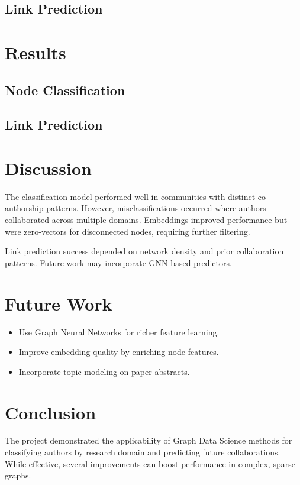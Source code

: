 \documentclass[conference]{IEEEtran}
\begin{document}
\subsection{Link Prediction}

\section{Results}

\subsection{Node Classification}

\subsection{Link Prediction}

\section{Discussion}
The classification model performed well in communities with distinct co-authorship patterns. However, misclassifications occurred where authors collaborated across multiple domains. Embeddings improved performance but were zero-vectors for disconnected nodes, requiring further filtering.

Link prediction success depended on network density and prior collaboration patterns. Future work may incorporate GNN-based predictors.

\section{Future Work}
\begin{itemize}
  \item Use Graph Neural Networks for richer feature learning.
  \item Improve embedding quality by enriching node features.
  \item Incorporate topic modeling on paper abstracts.
\end{itemize}

\section{Conclusion}
The project demonstrated the applicability of Graph Data Science methods for classifying authors by research domain and predicting future collaborations. While effective, several improvements can boost performance in complex, sparse graphs.


\end{document}
